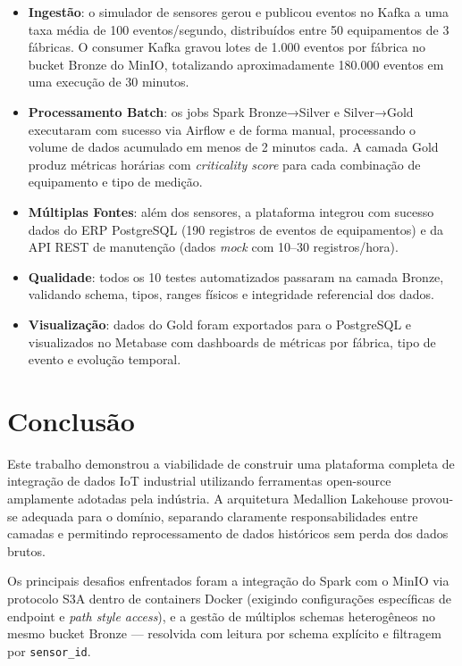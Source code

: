 \begin{itemize}
    \item \textbf{Ingestão}: o simulador de sensores gerou e publicou eventos no Kafka
    a uma taxa média de 100 eventos/segundo, distribuídos entre 50 equipamentos de
    3 fábricas. O consumer Kafka gravou lotes de 1.000 eventos por fábrica no bucket
    Bronze do MinIO, totalizando aproximadamente 180.000 eventos em uma execução de
    30 minutos.

    \item \textbf{Processamento Batch}: os jobs Spark Bronze→Silver e Silver→Gold
    executaram com sucesso via Airflow e de forma manual, processando o volume de dados
    acumulado em menos de 2 minutos cada. A camada Gold produz métricas horárias
    com \textit{criticality score} para cada combinação de equipamento e tipo de medição.

    \item \textbf{Múltiplas Fontes}: além dos sensores, a plataforma integrou com
    sucesso dados do ERP PostgreSQL (190 registros de eventos de equipamentos) e
    da API REST de manutenção (dados \textit{mock} com 10--30 registros/hora).

    \item \textbf{Qualidade}: todos os 10 testes automatizados passaram na camada
    Bronze, validando schema, tipos, ranges físicos e integridade referencial dos dados.

    \item \textbf{Visualização}: dados do Gold foram exportados para o PostgreSQL
    e visualizados no Metabase com dashboards de métricas por fábrica, tipo de evento
    e evolução temporal.
\end{itemize}

\section{Conclusão}

Este trabalho demonstrou a viabilidade de construir uma plataforma completa de
integração de dados IoT industrial utilizando ferramentas open-source amplamente
adotadas pela indústria. A arquitetura Medallion Lakehouse provou-se adequada para
o domínio, separando claramente responsabilidades entre camadas e permitindo reprocessamento
de dados históricos sem perda dos dados brutos.

Os principais desafios enfrentados foram a integração do Spark com o MinIO via protocolo
S3A dentro de containers Docker (exigindo configurações específicas de endpoint e
\textit{path style access}), e a gestão de múltiplos schemas heterogêneos no mesmo
bucket Bronze — resolvida com leitura por schema explícito e filtragem por \texttt{sensor\_id}.

